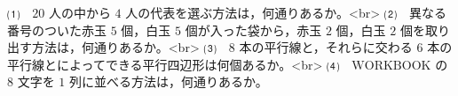 ⑴　$20$ 人の中から $4$ 人の代表を選ぶ方法は，何通りあるか。<br>
⑵　異なる番号のついた赤玉 $5$ 個，白玉 $5$ 個が入った袋から，赤玉 $2$ 個，白玉 $2$ 個を取り出す方法は，何通りあるか。<br>
⑶　$8$ 本の平行線と，それらに交わる $6$ 本の平行線とによってできる平行四辺形は何個あるか。<br>
⑷　$\mathrm{WORKBOOK}$ の $8$ 文字を $1$ 列に並べる方法は，何通りあるか。
